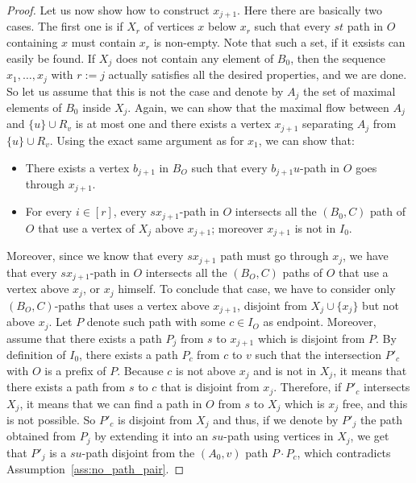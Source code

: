 \documentclass[utf8,11pt]{article}
\theoremstyle{plain}
\theoremstyle{definition}
\begin{document}
\begin{proof}
Let us now show how to construct $x_{j+1}$. Here there are basically two cases. The first one is if $X_r$ of vertices $x$ below $x_r$ such that every $st$ path in $O$ containing $x$ must contain $x_r$ is non-empty. Note that such a set, if it exsists can easily be found. If $X_j$ does not contain any element of $B_0$, then the sequence  $x_1, \dots, x_j$ with $r := j$ actually satisfies all the desired properties, and we are done. So let us assume that this is not the case and denote by $A_j$ the set of maximal elements of $B_0$ inside $X_{j}$. Again, we can show that the maximal flow between $A_{j}$ and $\{u\} \cup R_v$ is at most one and there exists a vertex $x_{j+1}$ separating $A_j$ from $\{u\} \cup R_v$. Using the exact same argument as for $x_1$, we can show that: 

\begin{itemize} 
    \item There exists a vertex $b_{j+1}$ in $B_O$ such that every $b_{j+1}u$-path in $O$ goes through $x_{j+1}$. 
    \item For every $i \in [r]$, every $sx_{j+1}$-path in $O$ intersects all the $(B_0,C)$ path of $O$ that use a vertex of $X_j$ above $x_{j+1}$; moreover $x_{j+1}$ is not in $I_0$.
\end{itemize}

Moreover, since we know that every $sx_{j+1}$ path must go through $x_{j}$, we have that every $sx_{j+1}$-path in $O$ intersects all the $(B_O,C)$ paths of $O$ that use a vertex above $x_{j}$, or $x_{j}$ himself. To conclude that case, we have to consider only $(B_O,C)$-paths that uses a vertex above $x_{j+1}$, disjoint from $X_{j} \cup \{x_j \}$ but not above $x_j$. Let $P$ denote such path with some $c \in I_O$ as endpoint. Moreover, assume that there exists a path $P_j$ from $s$ to $x_{j+1}$ which is disjoint from $P$. By definition of $I_0$, there exists a path $P_c$ from $c$ to $v$ such that the intersection $P'_c$ with $O$ is a prefix of $P$. Because $c$ is not above $x_j$ and is not in $X_j$, it means that there exists a path from $s$ to $c$ that is disjoint from $x_j$. Therefore, if $P'_c$ intersects $X_j$, it means that we can find a path in $O$ from $s$ to $X_j$ which is $x_j$ free, and this is not possible. So $P'_c$ is disjoint from $X_j$ and thus, 
if we denote by $P'_j$ the path obtained from $P_j$ by extending it into an $su$-path using vertices in $X_j$, we get that $P'_j$ is a $su$-path disjoint from the $(A_0,v)$ path $P \cdot P_c$, which contradicts Assumption~\ref{ass:no_path_pair}.


\end{proof}
\end{document}
